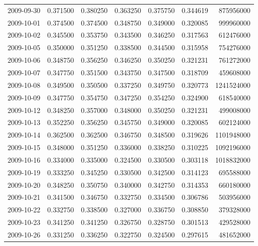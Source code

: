 \begin{tabular}{lrrrrrr}
2009-09-30 &    0.371500 &    0.380250 &    0.363250 &    0.375750 &    0.344619 &   875956000 \\
2009-10-01 &    0.374500 &    0.374500 &    0.348750 &    0.349000 &    0.320085 &   999960000 \\
2009-10-02 &    0.345500 &    0.353750 &    0.343500 &    0.346250 &    0.317563 &   612476000 \\
2009-10-05 &    0.350000 &    0.351250 &    0.338500 &    0.344500 &    0.315958 &   754276000 \\
2009-10-06 &    0.348750 &    0.356250 &    0.346250 &    0.350250 &    0.321231 &   761272000 \\
2009-10-07 &    0.347750 &    0.351500 &    0.343750 &    0.347500 &    0.318709 &   459608000 \\
2009-10-08 &    0.349500 &    0.350500 &    0.337250 &    0.349750 &    0.320773 &  1241524000 \\
2009-10-09 &    0.347750 &    0.354750 &    0.347250 &    0.354250 &    0.324900 &   618540000 \\
2009-10-12 &    0.348250 &    0.357000 &    0.348000 &    0.350250 &    0.321231 &   499008000 \\
2009-10-13 &    0.352250 &    0.356250 &    0.345750 &    0.349000 &    0.320085 &   602124000 \\
2009-10-14 &    0.362500 &    0.362500 &    0.346750 &    0.348500 &    0.319626 &  1101948000 \\
2009-10-15 &    0.348000 &    0.351250 &    0.336000 &    0.338250 &    0.310225 &  1092196000 \\
2009-10-16 &    0.334000 &    0.335000 &    0.324500 &    0.330500 &    0.303118 &  1018832000 \\
2009-10-19 &    0.333250 &    0.345250 &    0.330500 &    0.342500 &    0.314123 &   695588000 \\
2009-10-20 &    0.348250 &    0.350750 &    0.340000 &    0.342750 &    0.314353 &   660180000 \\
2009-10-21 &    0.341500 &    0.346750 &    0.332750 &    0.334500 &    0.306786 &   503956000 \\
2009-10-22 &    0.332750 &    0.338500 &    0.327000 &    0.336750 &    0.308850 &   379328000 \\
2009-10-23 &    0.341250 &    0.341250 &    0.326750 &    0.328750 &    0.301513 &   429528000 \\
2009-10-26 &    0.331250 &    0.336250 &    0.322750 &    0.324500 &    0.297615 &   481652000 \\

\end{tabular}
